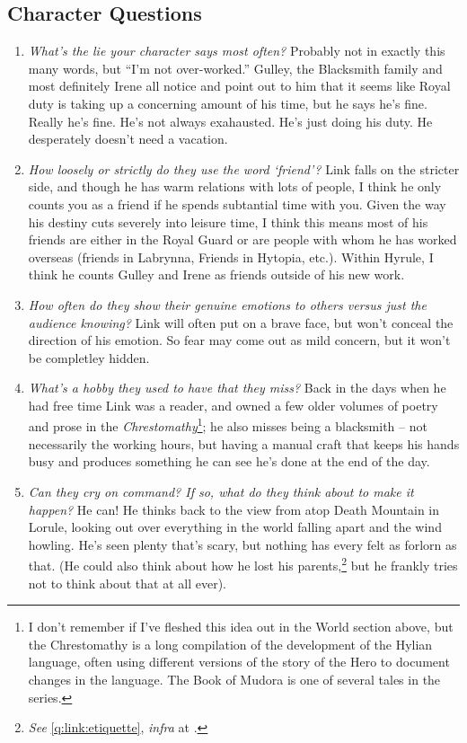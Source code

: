   \subsection{Character Questions}
  \begin{enumerate}
    \item\textit{What’s the lie your character says most often?}
        Probably not in exactly this many words, but ``I'm not over-worked.''  Gulley, the Blacksmith family and most definitely Irene all notice and point out to him that it seems like Royal duty is taking up a concerning amount of his time, but he says he's fine. Really he's fine. He's not always exahausted. He's just doing his duty. He desperately doesn't need a vacation.
    \item\textit{How loosely or strictly do they use the word ‘friend’?}
        Link falls on the stricter side, and though he has warm relations with lots of people, I think he only counts you as a friend if he spends subtantial time with you. Given the way his destiny cuts severely into leisure time, I think this means most of his friends are either in the Royal Guard or are people with whom he has worked overseas (friends in Labrynna, Friends in Hytopia, etc.). Within Hyrule, I think he counts Gulley and Irene as friends outside of his new work.
    \item\textit{How often do they show their genuine emotions to others versus just the audience knowing?}\label{q:link:masking}
        Link will often put on a brave face, but won't conceal the direction of his emotion. So fear may come out as mild concern, but it won't be completley hidden. 
    \item\textit{What’s a hobby they used to have that they miss?}
        Back in the days when he had free time Link was a reader, and owned a few older volumes of poetry and prose in the \emph{Chrestomathy}\footnote{I don't remember if I've fleshed this idea out in the World section above, but the Chrestomathy is a long compilation of the development of the Hylian language, often using different versions of the story of the Hero to document changes in the language. The Book of Mudora is one of several tales in the series.}; he also misses being a blacksmith -- not necessarily the working hours, but having a manual craft that keeps his hands busy and produces something he can see he's done at the end of the day.
    \item\textit{Can they cry on command? If so, what do they think about to make it happen?}
        He can! He thinks back to the view from atop Death Mountain in Lorule, looking out over everything in the world falling apart and the wind howling. He's seen plenty that's scary, but nothing has every felt as forlorn as that. (He could also think about how he lost his parents,\footnote{\textit{See} \ref{q:link:etiquette}, \textit{infra} at \pageref{q:link:etiquette}.} but he frankly tries not to think about that at all ever).

\end{enumerate}
